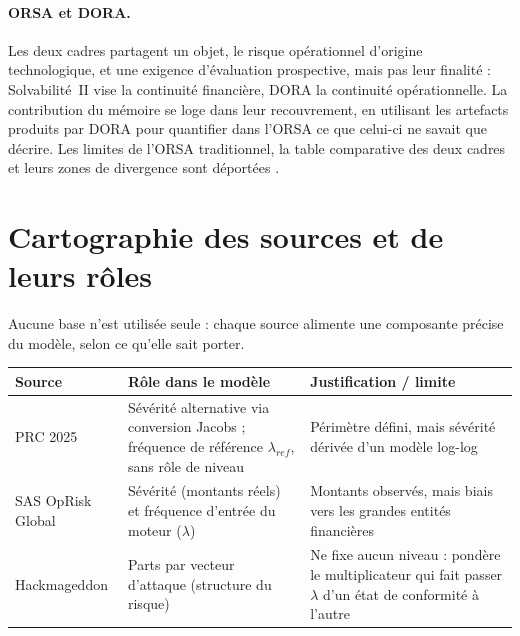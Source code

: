 

\paragraph{ORSA et DORA.} Les deux cadres partagent un objet, le risque opérationnel d'origine
technologique, et une exigence d'évaluation prospective, mais pas leur finalité : Solvabilité~II
vise la continuité financière, DORA la continuité opérationnelle. La contribution du mémoire se
loge dans leur recouvrement, en utilisant les artefacts produits par DORA pour quantifier dans
l'ORSA ce que celui-ci ne savait que décrire. Les limites de l'ORSA traditionnel, la table
comparative des deux cadres et leurs zones de divergence sont déportées \matcomp.



\section{Cartographie des sources et de leurs rôles}

Aucune base n'est utilisée seule : chaque source alimente une composante précise du modèle,
selon ce qu'elle sait porter.

\begin{center}
\renewcommand{\arraystretch}{1.3}
\begin{tabular}{>{\raggedright}p{3cm} >{\raggedright}p{5.5cm} >{\raggedright\arraybackslash}p{5.5cm}}
\toprule
\rowcolor{lightblue}
\textbf{Source} & \textbf{Rôle dans le modèle} & \textbf{Justification / limite} \\
\midrule
PRC 2025 & Sévérité alternative via conversion Jacobs ; fréquence de référence $\lambda_{ref}$, sans rôle de niveau &
Périmètre défini, mais sévérité dérivée d'un modèle log-log \\
\addlinespace
SAS OpRisk Global & Sévérité (montants réels) et fréquence d'entrée du moteur ($\lambda$) &
Montants observés, mais biais vers les grandes entités financières \\
\addlinespace
Hackmageddon & Parts par vecteur d'attaque (structure du risque) &
Ne fixe aucun niveau : pondère le multiplicateur qui fait passer $\lambda$ d'un état de conformité à l'autre \\
\bottomrule
\end{tabular}
\end{center}

